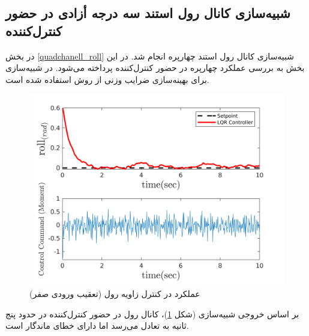 \subsection{شبیه‌سازی کانال رول استند سه درجه أزادی در حضور کنترل‌کننده }\label{roll_lqr_section_simulation}
در بخش
\ref{quadchanell_roll}
شبیه‌سازی کانال رول استند چهارپره انجام شد. در این بخش به بررسی عملکرد چهارپره در حضور کنترل‌کننده  پرداخته می‌شود. در شبیه‌سازی برای بهینه‌سازی ضرایب وزنی  از روش
 \cite{Karimi2010}
استفاده شده است.
\begin{figure}[H]
	\includegraphics[width=12cm]{../Figures/MIL/LQR/Roll/lqr_roll.png}
	\centering
	\caption{عملكرد  در کنترل زاويه رول (تعقیب ورودی صفر)}
	\label{lqr_roll_figure_simulation}
\end{figure}
بر اساس خروجی شبیه‌سازی (شکل
\ref{lqr_roll_figure_simulation})،
کانال رول در حضور کنترل‌کننده  در حدود پنج ثانیه به تعادل می‌رسد اما دارای خطای ماندگار است. 